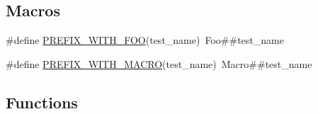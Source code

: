 \subsection*{Macros}
\begin{DoxyCompactItemize}
\item 
\#define \mbox{\hyperlink{googletest-param-test-test_8cc_a6414de581a925e7399b27c14e38f8a67}{P\+R\+E\+F\+I\+X\+\_\+\+W\+I\+T\+H\+\_\+\+F\+OO}}(test\+\_\+name)~Foo\#\#test\+\_\+name
\item 
\#define \mbox{\hyperlink{googletest-param-test-test_8cc_aeb9b224f65fb5b0b8f2323a6903d6a68}{P\+R\+E\+F\+I\+X\+\_\+\+W\+I\+T\+H\+\_\+\+M\+A\+C\+RO}}(test\+\_\+name)~Macro\#\#test\+\_\+name
\end{DoxyCompactItemize}
\subsection*{Functions}
